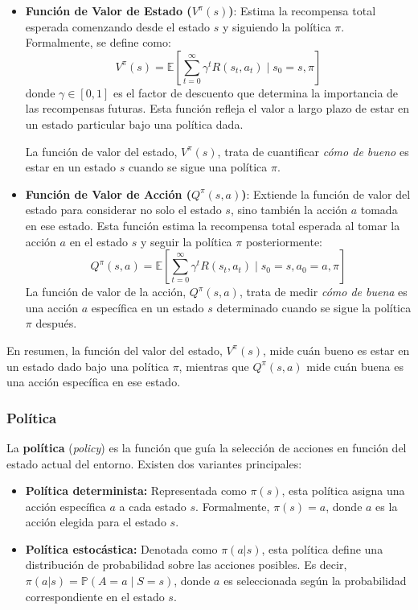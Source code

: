 \documentclass[a4paper,12pt]{report}
\begin{document}
\begin{itemize}
    \item \textbf{Función de Valor de Estado (\(V^{\pi}(s)\))}: Estima la recompensa total esperada 
    comenzando desde el estado \(s\) y siguiendo la política \(\pi\). Formalmente, se define como:
    \[
    V^{\pi}(s) = \mathbb{E}\left[\sum_{t=0}^{\infty} \gamma^t R(s_t, a_t) \mid s_0 = s, \pi\right]
    \]
    donde \(\gamma \in [0, 1]\) es el factor de descuento que determina la importancia de las 
    recompensas futuras. Esta función refleja el valor a largo plazo de estar en un estado particular 
    bajo una política dada.

    La función de valor del estado, \(V^{\pi}(s)\), trata de cuantificar \textit{cómo de bueno} es 
    estar en un estado \(s\) cuando se sigue una política \(\pi\).

    \item \textbf{Función de Valor de Acción (\(Q^{\pi}(s, a)\))}: Extiende la función de valor del 
    estado para considerar no solo el estado \(s\), sino también la acción \(a\) tomada en ese estado. 
    Esta función estima la recompensa total esperada al tomar la acción \(a\) en el estado \(s\) y 
    seguir la política \(\pi\) posteriormente:
    \[
    Q^{\pi}(s, a) = \mathbb{E}\left[\sum_{t=0}^{\infty} \gamma^t R(s_t, a_t) \mid s_0 = s, a_0 = a, \pi\right]
    \]
    La función de valor de la acción, \(Q^{\pi}(s, a)\), trata de medir \textit{cómo de buena} es una 
    acción \(a\) específica en un estado \(s\) determinado cuando se sigue la política \(\pi\) después.
 
\end{itemize}

En resumen, la función del valor del estado, \(V^{\pi}(s)\), mide cuán bueno es estar en un estado dado 
bajo una política \(\pi\), mientras que \(Q^{\pi}(s, a)\) mide cuán buena es una acción específica en 
ese estado.

\subsubsection{Política}

La \textbf{política} (\textit{policy}) es la función que guía la selección de acciones en función del estado actual del entorno. Existen dos variantes principales:

\begin{itemize}
    \item \textbf{Política determinista:} Representada como $\pi(s)$, esta política asigna una acción específica $a$ a cada estado $s$. Formalmente, $\pi(s) = a$, donde $a$ es la acción elegida para el estado $s$.

    \item \textbf{Política estocástica:} Denotada como $\pi(a|s)$, esta política define una distribución de probabilidad sobre las acciones posibles. Es decir, $\pi(a|s) = \mathbb{P}(A = a \mid S = s)$, donde $a$ es seleccionada según la probabilidad correspondiente en el estado $s$.
\end{itemize}
\end{document}
